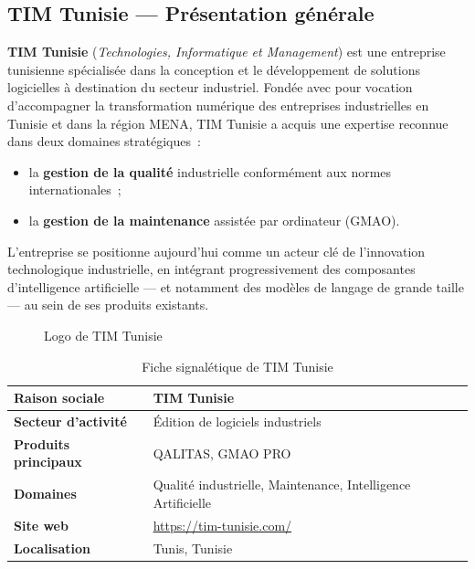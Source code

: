 \subsection{TIM Tunisie --- Présentation générale}

\textbf{TIM Tunisie} (\textit{Technologies, Informatique et Management}) est une entreprise tunisienne spécialisée dans la conception et le développement de solutions logicielles à destination du secteur industriel. Fondée avec pour vocation d'accompagner la transformation numérique des entreprises industrielles en Tunisie et dans la région MENA, TIM Tunisie a acquis une expertise reconnue dans deux domaines stratégiques~:

\begin{itemize}[noitemsep]
    \item la \textbf{gestion de la qualité} industrielle conformément aux normes internationales~;
    \item la \textbf{gestion de la maintenance} assistée par ordinateur (GMAO).
\end{itemize}

L'entreprise se positionne aujourd'hui comme un acteur clé de l'innovation technologique industrielle, en intégrant progressivement des composantes d'intelligence artificielle --- et notamment des modèles de langage de grande taille --- au sein de ses produits existants.

\begin{figure}[H]
    \centering
    \caption{Logo de TIM Tunisie}
    \label{fig:logo_tim}
\end{figure}

\begin{table}[H]
\centering
\caption{Fiche signalétique de TIM Tunisie}
\label{tab:fiche_tim}
\begin{tabularx}{\textwidth}{|l|X|}
\hline
\textbf{Raison sociale} & TIM Tunisie \\
\hline
\textbf{Secteur d'activité} & Édition de logiciels industriels \\
\hline
\textbf{Produits principaux} & QALITAS, GMAO PRO \\
\hline
\textbf{Domaines} & Qualité industrielle, Maintenance, Intelligence Artificielle \\
\hline
\textbf{Site web} & \url{https://tim-tunisie.com/} \\
\hline
\textbf{Localisation} & Tunis, Tunisie \\
\hline
\end{tabularx}
\end{table}


